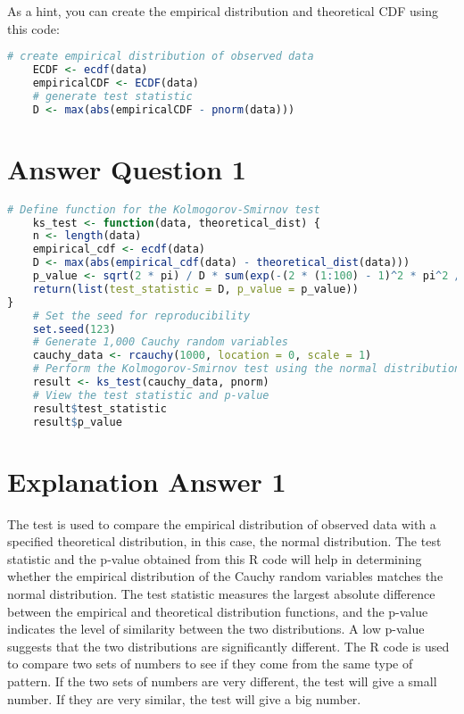 \documentclass[12pt,letterpaper]{article}
\begin{document}
	
\noindent As a hint, you can create the empirical distribution and theoretical CDF using this code:

\begin{lstlisting}[language=R]
	# create empirical distribution of observed data
	ECDF <- ecdf(data)
	empiricalCDF <- ECDF(data)
	# generate test statistic
	D <- max(abs(empiricalCDF - pnorm(data))) \end{lstlisting}
	
	\section*{Answer Question 1}

\begin{lstlisting}[language=R]
	# Define function for the Kolmogorov-Smirnov test
	ks_test <- function(data, theoretical_dist) {
	n <- length(data)
	empirical_cdf <- ecdf(data)
	D <- max(abs(empirical_cdf(data) - theoretical_dist(data)))
	p_value <- sqrt(2 * pi) / D * sum(exp(-(2 * (1:100) - 1)^2 * pi^2 / (8 * D^2)))
	return(list(test_statistic = D, p_value = p_value))
}
	# Set the seed for reproducibility
	set.seed(123)
	# Generate 1,000 Cauchy random variables
	cauchy_data <- rcauchy(1000, location = 0, scale = 1)
	# Perform the Kolmogorov-Smirnov test using the normal distribution as the theoretical reference
	result <- ks_test(cauchy_data, pnorm)
	# View the test statistic and p-value
	result$test_statistic
	result$p_value
\end{lstlisting}

	\vspace{.25cm}
\section*{Explanation Answer 1} 
\vspace{.25cm}
\noindent The test is used to compare the empirical distribution of observed data with a specified theoretical distribution, in this case, the normal distribution.
The test statistic and the p-value obtained from this R code will help in determining whether the empirical distribution of the Cauchy random variables matches the normal distribution. The test statistic measures the largest absolute difference between the empirical and theoretical distribution functions, and the p-value indicates the level of similarity between the two distributions. A low p-value suggests that the two distributions are significantly different.
The R code is used to compare two sets of numbers to see if they come from the same type of pattern. If the two sets of numbers are very different, the test will give a small number. If they are very similar, the test will give a big number.
\end{document}
